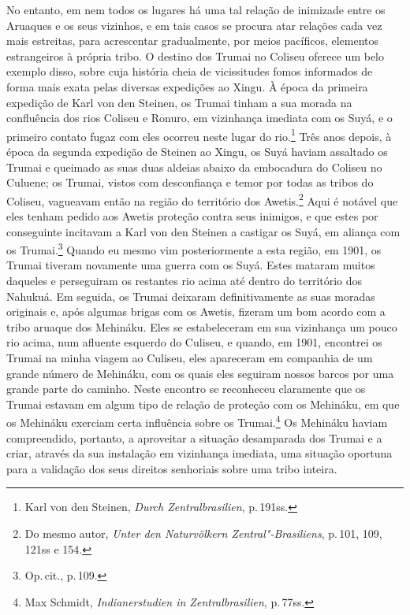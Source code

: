 No entanto, em nem todos os lugares há uma tal relação de inimizade
entre os Aruaques e os seus vizinhos, e em tais casos se procura atar
relações cada vez mais estreitas, para acrescentar gradualmente, por
meios pacíficos, elementos estrangeiros à própria tribo. O destino dos
Trumai no Coliseu oferece um belo exemplo disso, sobre cuja história
cheia de vicissitudes fomos informados de forma mais exata pelas
diversas expedições ao Xingu. À época da primeira expedição de Karl von
den Steinen, os Trumai tinham a sua morada na confluência dos rios
Coliseu e Ronuro, em vizinhança imediata com os Suyá, e o primeiro
contato fugaz com eles ocorreu neste lugar do rio.\footnote{Karl von den
  Steinen, \textit{Durch Zentralbrasilien}, p.\,191ss.} Três anos depois,
à época da segunda expedição de Steinen ao Xingu, os Suyá haviam
assaltado os Trumai e queimado as suas duas aldeias abaixo da embocadura
do Coliseu no Culuene; os Trumai, vistos com desconfiança e temor por
todas as tribos do Coliseu, vagueavam então na região do território dos
Awetis.\footnote{Do mesmo autor, \textit{Unter den Naturvölkern
  Zentral"-Brasiliens}, p.\,101, 109, 121ss e 154.} Aqui é notável que
eles tenham pedido aos Awetis proteção contra seus inimigos, e que estes
por conseguinte incitavam a Karl von den Steinen a castigar os Suyá, em
aliança com os Trumai.\footnote{Op.\,cit., p.\,109.} Quando eu mesmo vim
posteriormente a esta região, em 1901, os Trumai tiveram novamente uma
guerra com os Suyá. Estes mataram muitos daqueles e perseguiram os
restantes rio acima até dentro do território dos Nahukuá. Em seguida, os
Trumai deixaram definitivamente as suas moradas originais e, após
algumas brigas com os Awetis, fizeram um bom acordo com a tribo aruaque
dos Mehináku. Eles se estabeleceram em sua vizinhança um pouco rio
acima, num afluente esquerdo do Culiseu, e quando, em 1901, encontrei os
Trumai na minha viagem ao Culiseu, eles apareceram em companhia de um
grande número de Mehináku, com os quais eles seguiram nossos barcos por
uma grande parte do caminho. Neste encontro se reconheceu claramente
que os Trumai estavam em algum tipo de relação de proteção com os
Mehináku, em que os Mehináku exerciam certa influência sobre os
Trumai.\footnote{Max Schmidt, \textit{Indianerstudien in Zentralbrasilien},
  p.\,77ss.} Os Mehináku haviam compreendido, portanto, a aproveitar a
situação desamparada dos Trumai e a criar, através da sua instalação em
vizinhança imediata, uma situação oportuna para a validação dos seus
direitos senhoriais sobre uma tribo inteira.

